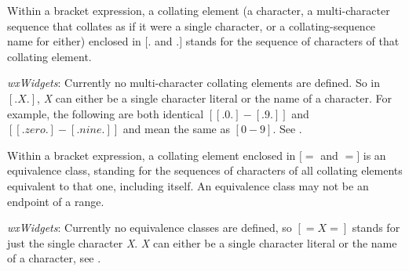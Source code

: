 Within a bracket
expression, a collating element (a character, a multi-character sequence
that collates as if it were a single character, or a collating-sequence
name for either) enclosed in {\bf $[.$} and {\bf $.]$} stands for the
sequence of characters of that collating element.

{\it wxWidgets}: Currently no multi-character collating elements are defined.
So in {\bf $[.X.]$}, {\it X} can either be a single character literal or
the name of a character. For example, the following are both identical
 {\bf $[[.0.]-[.9.]]$} and {\bf $[[.zero.]-[.nine.]]$} and mean the same as
 {\bf $[0-9]$}.
 See .

%

Within a bracket expression, a collating element enclosed in {\bf $[=$} and {\bf $=]$}
is an equivalence class, standing for the sequences of characters of all
collating elements equivalent to that one, including itself.
An equivalence class may not be an endpoint of a range.


{\it wxWidgets}: Currently no equivalence classes are defined, so 
{\bf $[=X=]$} stands for just the single character {\it X}. 
 {\it X} can either be a single character literal or the name of a character,
see .


